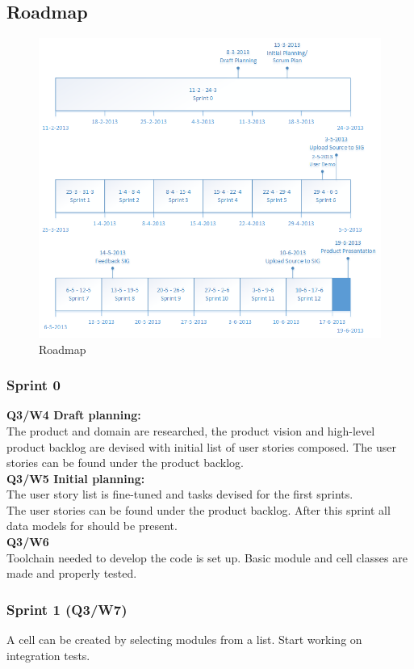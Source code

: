 \documentclass[10pt,a4paper]{report}
\begin{document}
		\subsection{Roadmap}
			\begin{figure}[htb]
			\centerline{\includegraphics[scale=1]{Roadmap.png}}
			\caption{Roadmap}
			\label{fig: Roadmap}
			\end{figure}	
			\subsubsection*{Sprint 0}
				\textbf{Q3/W4 Draft planning:}\\ The product and domain are researched, the product vision and high-level product backlog are devised with initial list of user stories composed. The user stories can be found under the product backlog.\\
				\textbf{Q3/W5 Initial planning:}\\ The user story list is fine-tuned and tasks devised for the first sprints.\\
				The user stories can be found under the product backlog. After this sprint all data models for should be present.\\		
				\textbf{Q3/W6}\\
				Toolchain needed to develop the code is set up. Basic module and cell classes are made and properly tested.
			\subsubsection*{Sprint 1 (Q3/W7)}
				A cell can be created by selecting modules from a list. Start working on integration tests.
\end{document}

